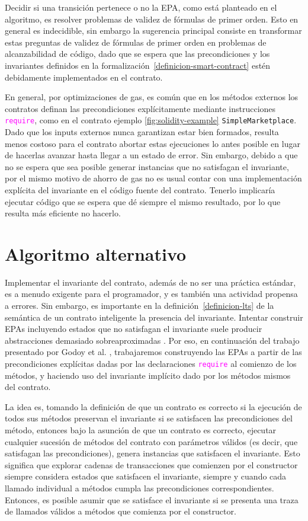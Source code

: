 Decidir si una transición pertenece o no la EPA, como está planteado en el algoritmo, es resolver problemas de validez de fórmulas de primer orden.
Esto en general es indecidible, sin embargo la sugerencia principal consiste en transformar estas preguntas de validez de fórmulas de primer orden en problemas de alcanzabilidad de código, dado que se espera que las precondiciones y los invariantes definidos en la formalización~\ref{definicion-smart-contract} estén debidamente implementados en el contrato.

En general, por optimizaciones de gas, es común que en los métodos externos los contratos definan las precondiciones explícitamente mediante instrucciones \textcolor{magenta}{\texttt{require}}, como en el contrato ejemplo \ref{fig:solidity-example} \texttt{SimpleMarketplace}.
Dado que los inputs externos nunca garantizan estar bien formados, resulta menos costoso para el contrato abortar estas ejecuciones lo antes posible en lugar de hacerlas avanzar hasta llegar a un estado de error.
Sin embargo, debido a que no se espera que sea posible generar instancias que no satisfagan el invariante, por el mismo motivo de ahorro de gas no es usual contar con una implementación explícita del invariante en el código fuente del contrato.
Tenerlo implicaría ejecutar código que se espera que dé siempre el mismo resultado, por lo que resulta más eficiente no hacerlo.

\section{Algoritmo alternativo}
Implementar el invariante del contrato, además de no ser una práctica estándar, es a menudo exigente para el programador, y es también una actividad propensa a errores.
Sin embargo, es importante en la definición~\ref{definicion-lts} de la semántica de un contrato inteligente la  presencia del invariante.
Intentar construir EPAs incluyendo estados que no satisfagan el invariante suele producir abstracciones demasiado sobreaproximadas \cite{de-caso-epa}.
Por eso, en continuación del trabajo presentado por Godoy et al. \cite{predicate-abstraction-for-smart-contract-validation}, trabajaremos construyendo las EPAs a partir de las precondiciones explícitas dadas por las declaraciones \textcolor{magenta}{\texttt{require}} al comienzo de los métodos, y haciendo uso  del invariante implícito dado por los métodos mismos del contrato.

La idea es, tomando la definición de que un contrato es correcto si la ejecución de todos sus métodos preservan el invariante si se satisfacen las precondiciones del método, entonces bajo la asunción de que un contrato es correcto, ejecutar cualquier sucesión de métodos del contrato con parámetros válidos (es decir, que satisfagan las precondiciones), genera instancias que satisfacen el invariante.
Esto significa que explorar cadenas de transacciones que comienzen por el constructor siempre considera estados que satisfacen el invariante, siempre y cuando cada llamado individual a métodos cumpla las precondiciones correspondientes.
Entonces, es posible asumir que se satisface el invariante si se presenta una traza de llamados válidos a métodos que comienza por el constructor.


